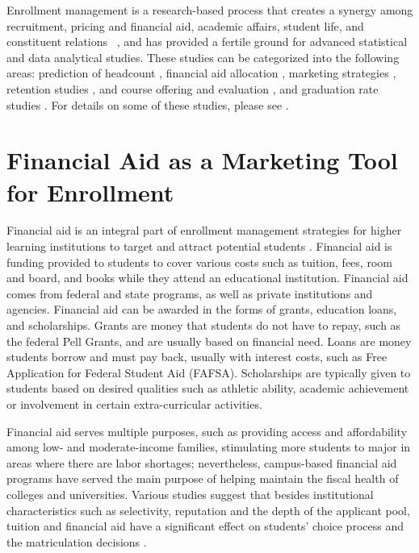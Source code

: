 \documentclass[12pt,english]{report}
\begin{document}
Enrollment management is a research-based process that creates a synergy among
recruitment, pricing and financial aid, academic affairs, student life, and
constituent relations ~\citep{huddlestonenrollment2000}, and has provided a
fertile ground for advanced statistical and data analytical studies. These
studies can be categorized into the following areas: prediction of headcount
\citep{Chang2006}, financial aid allocation \citep{leedsthe2014, Dynarski2003},
marketing strategies \citep{pandeyAdvertise}, retention studies
\citep{grossinstitutional2015, Dynarski2003, Herzog2006}, and course offering
and evaluation \citep{SurjeetClassEnroll,luan2006courseoffer}, and graduation
rate studies \citep{Bailey2006}.  For details on some of these studies, please
see \citep{Luan2006}.

\section{Financial Aid as a Marketing Tool for Enrollment}
Financial aid is an integral part of enrollment management strategies for
higher learning institutions to target and attract potential students
\citep{Dynarski2013}.  Financial aid is funding provided to students to cover
various costs such as tuition, fees, room and board, and books while they
attend an educational institution. Financial aid comes from federal and state
programs, as well as private institutions and agencies.  Financial aid can be
awarded in the forms of grants, education loans, and scholarships.  Grants are
money that students do not have to repay, such as the federal Pell Grants, and
are usually based on financial need.  Loans are money students borrow and must
pay back, usually with interest costs, such as Free Application for Federal
Student Aid (FAFSA). Scholarships are typically given to students based on
desired qualities such as athletic ability, academic achievement or involvement
in certain extra-curricular activities.

Financial aid serves multiple purposes, such as providing access and
affordability among low- and moderate-income families, stimulating more
students to major in areas where there are labor shortages; nevertheless,
campus-based financial aid programs have served the main purpose of helping
maintain the fiscal health of colleges and universities. Various studies
suggest that besides institutional characteristics such as selectivity,
reputation and the depth of the applicant pool, tuition and financial aid have
a significant effect on students' choice process and the matriculation
decisions \citep{Fulleri2014}.
\end{document}
